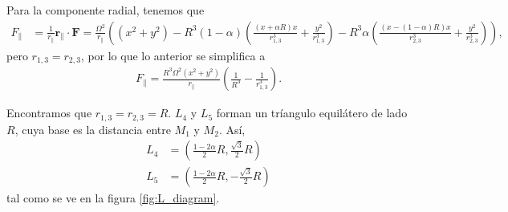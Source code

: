 Para la componente radial, tenemos que
\begin{align*}
 F_{\parallel} &= \frac{1}{r_{\parallel}} \mathbf{r}_{\parallel} \cdot \mathbf{F} = \frac{\Omega^2}{r_\parallel} \left( (x^2 + y^2) - R^3 (1-\alpha ) \left( \frac{(x+ \alpha R)x}{r_{1,3}^3} + \frac{y^2}{r_{1,3}^3} \right) - R^3 \alpha \left( \frac{(x - (1-\alpha) R)x}{r_{2,3}^3} + \frac{y^2}{r_{2,3}^3} \right) \right),
\end{align*}
pero $r_{1,3} = r_{2,3}$, por lo que lo anterior se simplifica a 
\begin{align*}
 F_{\parallel} = \frac{R^3 \Omega^2 (x^2 + y^2)}{r_\parallel} \left( \frac{1}{R^3} - \frac{1}{r_{1,3}^3} \right).
\end{align*}

Encontramos que $r_{1,3} = r_{2,3} = R$. $L_4$ y $L_5$ forman un tríangulo equilátero de lado $R$, cuya base es la distancia entre $M_1$ y $M_2$. Así,
\begin{align}
 L_4 &= \left( \frac{1 - 2\alpha}{2}  R , \frac{\sqrt{3}}{2} R \right) \\
 L_5 &= \left( \frac{1 - 2\alpha}{2}  R  , -\frac{\sqrt{3}}{2} R \right)
 \label{eq:L4_L5}
\end{align} 
tal como se ve en la figura \ref{fig:L_diagram}.


